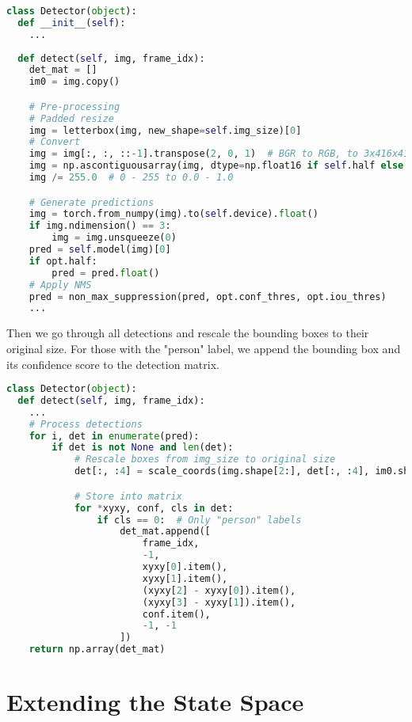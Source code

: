\documentclass{article}
\numberwithin{algorithm}{section}
\begin{document}
\begin{lstlisting}[language=Python]
class Detector(object):
  def __init__(self):
    ...
  
  def detect(self, img, frame_idx):
    det_mat = []
    im0 = img.copy()

    # Pre-processing
    # Padded resize
    img = letterbox(img, new_shape=self.img_size)[0]
    # Convert
    img = img[:, :, ::-1].transpose(2, 0, 1)  # BGR to RGB, to 3x416x416
    img = np.ascontiguousarray(img, dtype=np.float16 if self.half else np.float32)  # uint8 to fp16/fp32
    img /= 255.0  # 0 - 255 to 0.0 - 1.0

    # Generate predictions
    img = torch.from_numpy(img).to(self.device).float()
    if img.ndimension() == 3:
        img = img.unsqueeze(0)
    pred = self.model(img)[0]
    if opt.half:
        pred = pred.float()
    # Apply NMS
    pred = non_max_suppression(pred, opt.conf_thres, opt.iou_thres)
    ...
\end{lstlisting}

Then we go through all detections and rescale the bounding boxes to their original size.
For those with the "person" label, we append the bounding box and its confidence score to the detection matrix.

\begin{lstlisting}[language=Python]
class Detector(object):
  def detect(self, img, frame_idx): 
    ...
    # Process detections
    for i, det in enumerate(pred):
        if det is not None and len(det):
            # Rescale boxes from img_size to original size
            det[:, :4] = scale_coords(img.shape[2:], det[:, :4], im0.shape).round()

            # Store into matrix
            for *xyxy, conf, cls in det:
                if cls == 0:  # Only "person" labels
                    det_mat.append([
                        frame_idx,
                        -1,
                        xyxy[0].item(),
                        xyxy[1].item(),
                        (xyxy[2] - xyxy[0]).item(),
                        (xyxy[3] - xyxy[1]).item(),
                        conf.item(),
                        -1, -1
                    ])
    return np.array(det_mat)
\end{lstlisting}

\section{Extending the State Space}
\end{document}
